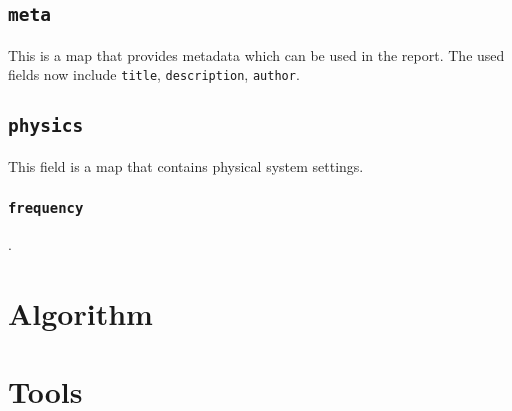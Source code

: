 \subsection{\texttt{meta}}
This is a map that provides metadata which can be used in the report.
The used fields now include
\texttt{title},
\texttt{description},
\texttt{author}.

\subsection{\texttt{physics}}
This field is a map that contains physical system settings.

\subsubsection{\texttt{frequency}}.


\section{Algorithm}

\section{Tools}
